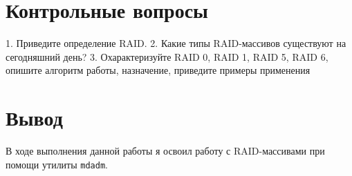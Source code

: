 \documentclass[12pt]{article}
\begin{document}
\section{Контрольные вопросы}
\begin{enumerate}
	1. Приведите определение RAID.
	2. Какие типы RAID-массивов существуют на сегодняшний день?
	3. Охарактеризуйте RAID 0, RAID 1, RAID 5, RAID 6, опишите алгоритм работы,
	назначение, приведите примеры применения
\end{enumerate}

\section{Вывод}
В ходе выполнения данной работы я освоил работу с RAID-массивами при помощи утилиты \texttt{mdadm}.
\end{document}
